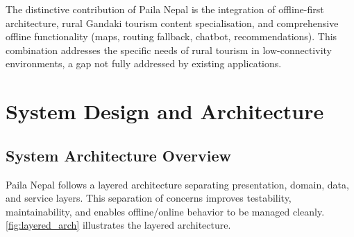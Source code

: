 \documentclass[12pt,a4paper,oneside]{report}
\begin{document}
The distinctive contribution of Paila Nepal is the integration of offline-first architecture, rural Gandaki tourism content specialisation, and comprehensive offline functionality (maps, routing fallback, chatbot, recommendations). This combination addresses the specific needs of rural tourism in low-connectivity environments, a gap not fully addressed by existing applications.
\chapter{System Design and Architecture}
\label{ch:design}

\section{System Architecture Overview}
\label{sec:arch_overview}

Paila Nepal follows a layered architecture separating presentation, domain, data, and service layers. This separation of concerns improves testability, maintainability, and enables offline/online behavior to be managed cleanly. \cref{fig:layered_arch} illustrates the layered architecture.
\end{document}
